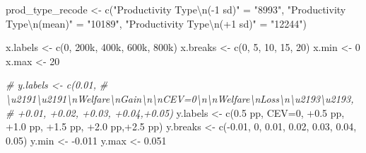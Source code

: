 \documentclass[
]{book}
\newenvironment{Shaded}{\begin{snugshade}}{\end{snugshade}}
\newcommand{\CommentTok}[1]{\textcolor[rgb]{0.56,0.35,0.01}{\textit{#1}}}
\newcommand{\DecValTok}[1]{\textcolor[rgb]{0.00,0.00,0.81}{#1}}
\newcommand{\FloatTok}[1]{\textcolor[rgb]{0.00,0.00,0.81}{#1}}
\newcommand{\FunctionTok}[1]{\textcolor[rgb]{0.00,0.00,0.00}{#1}}
\newcommand{\NormalTok}[1]{#1}
\newcommand{\OtherTok}[1]{\textcolor[rgb]{0.56,0.35,0.01}{#1}}
\newcommand{\SpecialCharTok}[1]{\textcolor[rgb]{0.00,0.00,0.00}{#1}}
\newcommand{\StringTok}[1]{\textcolor[rgb]{0.31,0.60,0.02}{#1}}
\begin{document}
\begin{Shaded}
\begin{Highlighting}[]
\NormalTok{prod\_type\_recode }\OtherTok{\textless{}{-}} \FunctionTok{c}\NormalTok{(}\StringTok{"Productivity Type}\SpecialCharTok{\textbackslash{}n}\StringTok{({-}1 sd)"} \OtherTok{=} \StringTok{"8993"}\NormalTok{,}
                      \StringTok{"Productivity Type}\SpecialCharTok{\textbackslash{}n}\StringTok{(mean)"} \OtherTok{=} \StringTok{"10189"}\NormalTok{,}
                      \StringTok{"Productivity Type}\SpecialCharTok{\textbackslash{}n}\StringTok{(+1 sd)"} \OtherTok{=} \StringTok{"12244"}\NormalTok{)}

\NormalTok{x.labels }\OtherTok{\textless{}{-}} \FunctionTok{c}\NormalTok{(}\StringTok{\textquotesingle{}0\textquotesingle{}}\NormalTok{, }\StringTok{\textquotesingle{}200k\textquotesingle{}}\NormalTok{, }\StringTok{\textquotesingle{}400k\textquotesingle{}}\NormalTok{, }\StringTok{\textquotesingle{}600k\textquotesingle{}}\NormalTok{, }\StringTok{\textquotesingle{}800k\textquotesingle{}}\NormalTok{)}
\NormalTok{x.breaks }\OtherTok{\textless{}{-}} \FunctionTok{c}\NormalTok{(}\DecValTok{0}\NormalTok{,}
              \DecValTok{5}\NormalTok{,}
              \DecValTok{10}\NormalTok{,}
              \DecValTok{15}\NormalTok{,}
              \DecValTok{20}\NormalTok{)}
\NormalTok{x.min }\OtherTok{\textless{}{-}} \DecValTok{0}
\NormalTok{x.max }\OtherTok{\textless{}{-}} \DecValTok{20}

\CommentTok{\# y.labels \textless{}{-} c(\textquotesingle{}{-}0.01\textquotesingle{},}
\CommentTok{\#               \textquotesingle{}\textbackslash{}u2191\textbackslash{}u2191\textbackslash{}nWelfare\textbackslash{}nGain\textbackslash{}n\textbackslash{}nCEV=0\textbackslash{}n\textbackslash{}nWelfare\textbackslash{}nLoss\textbackslash{}n\textbackslash{}u2193\textbackslash{}u2193\textquotesingle{},}
\CommentTok{\#               \textquotesingle{}+0.01\textquotesingle{}, \textquotesingle{}+0.02\textquotesingle{}, \textquotesingle{}+0.03\textquotesingle{}, \textquotesingle{}+0.04\textquotesingle{},\textquotesingle{}+0.05\textquotesingle{})}
\NormalTok{y.labels }\OtherTok{\textless{}{-}} \FunctionTok{c}\NormalTok{(}\StringTok{\textquotesingle{}{-}0.5 pp\textquotesingle{}}\NormalTok{,}
              \StringTok{\textquotesingle{}CEV=0\textquotesingle{}}\NormalTok{,}
              \StringTok{\textquotesingle{}+0.5 pp\textquotesingle{}}\NormalTok{, }\StringTok{\textquotesingle{}+1.0 pp\textquotesingle{}}\NormalTok{, }\StringTok{\textquotesingle{}+1.5 pp\textquotesingle{}}\NormalTok{, }\StringTok{\textquotesingle{}+2.0 pp\textquotesingle{}}\NormalTok{,}\StringTok{\textquotesingle{}+2.5 pp\textquotesingle{}}\NormalTok{)}
\NormalTok{y.breaks }\OtherTok{\textless{}{-}} \FunctionTok{c}\NormalTok{(}\SpecialCharTok{{-}}\FloatTok{0.01}\NormalTok{, }\DecValTok{0}\NormalTok{, }\FloatTok{0.01}\NormalTok{, }\FloatTok{0.02}\NormalTok{, }\FloatTok{0.03}\NormalTok{, }\FloatTok{0.04}\NormalTok{, }\FloatTok{0.05}\NormalTok{)}
\NormalTok{y.min }\OtherTok{\textless{}{-}} \SpecialCharTok{{-}}\FloatTok{0.011}
\NormalTok{y.max }\OtherTok{\textless{}{-}} \FloatTok{0.051}


\end{Highlighting}
\end{Shaded}
\end{document}
